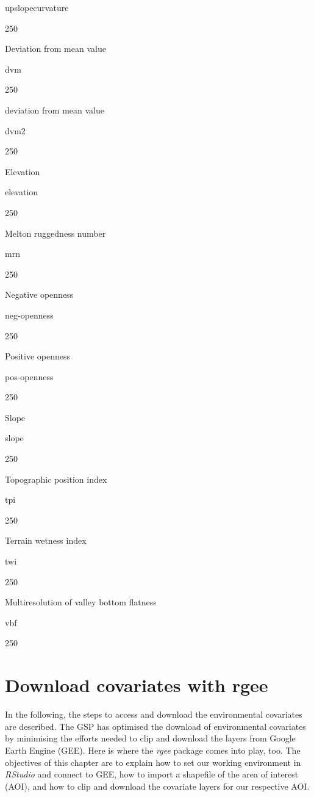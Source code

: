 \documentclass[
  10pt,
  b5paper,
  oneside]{book}
\begin{document}
upslopecurvature

250

Deviation from mean value

dvm

250

deviation from mean value

dvm2

250

Elevation

elevation

250

Melton ruggedness number

mrn

250

Negative openness

neg-openness

250

Positive openness

pos-openness

250

Slope

slope

250

Topographic position index

tpi

250

Terrain wetness index

twi

250

Multiresolution of valley bottom flatness

vbf

250

\hypertarget{download-covariates-with-rgee}{%
\section{Download covariates with rgee}\label{download-covariates-with-rgee}}

In the following, the steps to access and download the environmental covariates are described. The GSP has optimised the download of environmental covariates by minimising the efforts needed to clip and download the layers from Google Earth Engine (GEE). Here is where the \emph{rgee} package comes into play, too. The objectives of this chapter are to explain how to set our working environment in \emph{RStudio} and connect to GEE, how to import a shapefile of the area of interest (AOI), and how to clip and download the covariate layers for our respective AOI.
\end{document}
